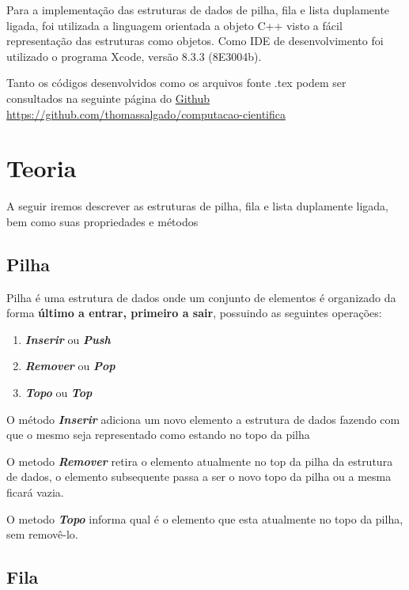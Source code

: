\documentclass[rascunho,xindy,sublist]{fei}
\begin{document}
Para a implementação das estruturas de dados de pilha, fila e lista duplamente ligada, foi utilizada a linguagem orientada a objeto C++ visto a fácil representação das estruturas como objetos.
Como IDE de desenvolvimento foi utilizado o programa Xcode, versão 8.3.3 (8E3004b).

Tanto os códigos desenvolvidos como os arquivos fonte .tex podem ser consultados na seguinte página do  \href{https://github.com/thomassalgado/computacao-cientifica}{Github} 
\url{https://github.com/thomassalgado/computacao-cientifica}

\chapter{Teoria}

A seguir iremos descrever as estruturas de pilha, fila e lista duplamente ligada, bem como suas propriedades e métodos

\section{Pilha}

Pilha é uma estrutura de dados onde um conjunto de elementos é organizado da forma \textbf{último a entrar, primeiro a sair}, possuindo as seguintes operações:

\begin{enumerate}
  \item \textbf{\textit{Inserir}} ou \textbf{\textit{Push}}
  \item \textbf{\textit{Remover}} ou \textbf{\textit{Pop}}
  \item \textbf{\textit{Topo}} ou \textbf{\textit{Top}}
\end{enumerate}

O método \textbf{\textit{Inserir}} adiciona um novo elemento a estrutura de dados fazendo com que o mesmo seja representado como estando no topo da pilha

O metodo \textbf{\textit{Remover}} retira o elemento atualmente no top da pilha da estrutura de dados, o elemento subsequente passa a ser o novo topo da pilha ou a mesma ficará vazia.

O metodo \textbf{\textit{Topo}} informa qual é o elemento que esta atualmente no topo da pilha, sem removê-lo.

\section{Fila}
\end{document}
